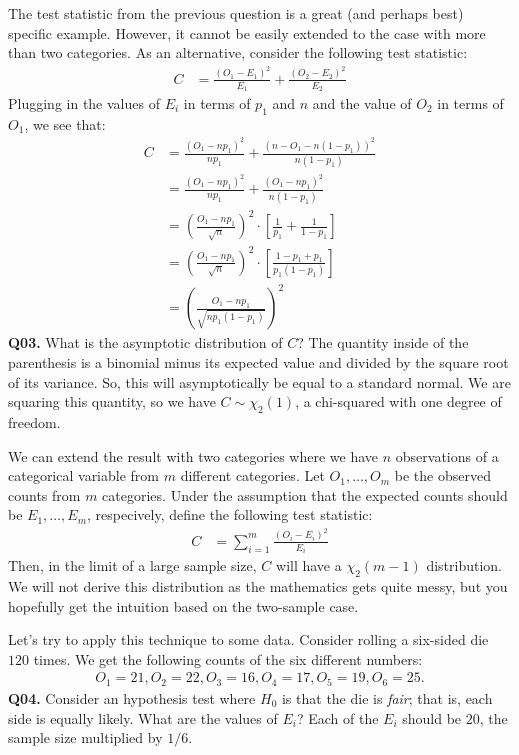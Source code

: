 \documentclass[12pt]{article}
\newcommand{\cblack}{\color{Black}}
\newcommand{\cblue}{\color{MidnightBlue}}
\begin{document}
The test statistic from the previous question is a great (and perhaps best)
specific example. However, it cannot be easily extended to the case with more
than two categories. As an alternative, consider the following test statistic:
\begin{align*}
C &= \frac{(O_1 - E_1)^2}{E_1} + \frac{(O_2 - E_2)^2}{E_2}
\end{align*} 
Plugging in the values of $E_i$ in terms of $p_1$ and $n$ and the value of $O_2$
in terms of $O_1$, we see that:
\begin{align*}
C &= \frac{(O_1 - n p_1)^2}{n p_1} + \frac{(n - O_1 - n (1 - p_1))^2}{n (1 - p_1)} \\
&= \frac{(O_1 - n p_1)^2}{n p_1} + \frac{(O_1 - n p_1)^2}{n (1 - p_1)} \\
&= \left(\frac{O_1 - n p_1}{\sqrt{n}} \right)^2 \cdot \left[ \frac{1}{p_1} + \frac{1}{1-p_1} \right] \\
&= \left(\frac{O_1 - n p_1}{\sqrt{n}} \right)^2 \cdot \left[ \frac{1 - p_1 + p_1}{p_1(1-p_1)} \right] \\
&= \left(\frac{O_1 - n p_1}{\sqrt{n p_1 (1 - p_1)}} \right)^2
\end{align*} 
\textbf{Q03.} What is the asymptotic distribution of $C$? \cblue The quantity
inside of the parenthesis is a binomial minus its expected value and divided 
by the square root of its variance. So, this will asymptotically be equal to 
a standard normal. We are squaring this quantity, so we have $C \sim \chi_2(1)$,
a chi-squared with one degree of freedom. \cblack

We can extend the result with two categories where we have $n$ observations of a 
categorical variable from $m$ different categories. Let $O_1, \ldots, O_m$ be
the observed counts from $m$ categories. Under the assumption that the expected
counts should be $E_1, \ldots, E_m$, respecively, define the following test statistic:
\begin{align*}
C &= \sum_{i=1}^m \frac{(O_i - E_i)^2}{E_i}
\end{align*}
Then, in the limit of a large sample size, $C$ will have a $\chi_2(m - 1)$ distribution.
We will not derive this distribution as the mathematics gets quite messy, but you 
hopefully get the intuition based on the two-sample case.


Let's try to apply this technique to some data. Consider rolling a six-sided die
$120$ times. We get the following counts of the six different numbers:
\begin{align*}
O_1 = 21, O_2 = 22, O_3 = 16, O_4 = 17, O_5 = 19, O_6 = 25.
\end{align*}
\textbf{Q04.} Consider an hypothesis test where $H_0$ is that the die is \textit{fair};
that is, each side is equally likely. What are the values of $E_i$? \cblue Each of the
$E_i$ should be $20$, the sample size multiplied by $1/6$. \cblack
\end{document}
